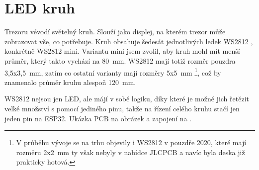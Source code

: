 \section{LED kruh}
\label{WS2812}

Trezoru vévodí světelný kruh. Slouží jako displej, na kterém trezor může zobrazovat vše, co potřebuje. Kruh obsahuje šedesát jednotlivých ledek 
\href{https://cdn-shop.adafruit.com/datasheets/WS2812B.pdf}{WS2812} \parencite{WS2812}, konkrétně WS2812 mini. Variantu mini jsem zvolil, aby kruh mohl mít menší
průměr, který takto vychází na 80~mm. WS2812 mají totiž rozměr pouzdra 3,5x3,5~mm, zatím co ostatní varianty mají rozměry 5x5~mm \footnote{V průběhu vývoje se na trhu 
objevily i WS2812 v pouzdře 2020, které mají rozměru 2x2~mm ty však nebyly v nabídce JLCPCB a navíc byla deska již prakticky hotová.}, což by znamenalo průměr kruhu alespoň 120~mm.

WS2812 nejsou jen LED, ale májí v sobě logiku, díky které je možné jich řetězit velké množství s pomocí jediného pinu, takže na řízení celého kruhu stačí jen jeden pin na ESP32.\newline
Ukázka PCB na obrázek  a zapojení na .

\newpage